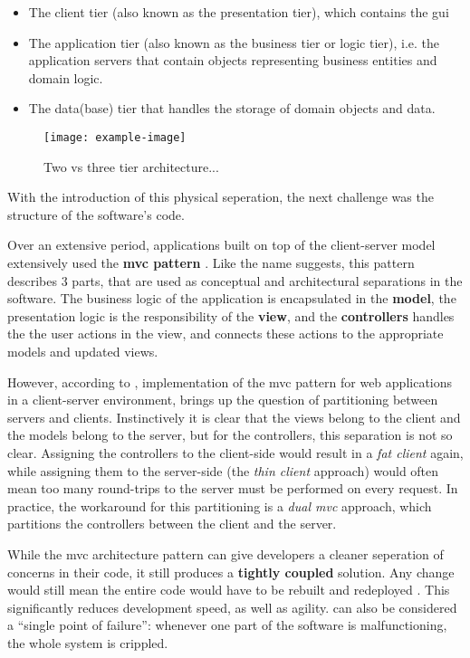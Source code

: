 \begin{itemize}
    \item The client tier (also known as the presentation tier), which contains
    the \gls{gui}
    \item The application tier (also known as the business tier or logic tier),
    i.e. the application servers that contain objects representing business
    entities and domain logic.
    \item The data(base) tier that handles the storage of domain objects and data.
\end{itemize}


\begin{figure} %
    \centering
    \texttt{[image: example-image]}
    \caption[Two vs three tier architecture]{Two vs three tier architecture...}
\end{figure}

With the introduction of this physical seperation, the next challenge was the
structure of the software's code.  

Over an extensive period, applications built on top of the client-server model
extensively used the \textbf{\gls{mvc} pattern} \autocite{Pavlenko_etal_2020}. Like the
name suggests, this pattern describes 3 parts, that are used as conceptual and
architectural separations in the software. The business logic of the application
is encapsulated in the \textbf{model}, the presentation logic is the
responsibility of the \textbf{view}, and the \textbf{controllers} handles the
the user actions in the view, and connects these actions to the appropriate
models and updated views.

However, according to \textcite{Leff_Raylfield_2001}, implementation of the
\gls{mvc} pattern for web applications in a client-server environment, brings up
the question of partitioning between servers and clients. Instinctively it is
clear that the views belong to the client and the models belong to the server,
but for the controllers, this separation is not so clear. Assigning the
controllers to the client-side would result in a \textit{fat client} again,
while assigning them to the server-side (the \textit{thin client} approach)
would often mean too many round-trips to the server must be performed on every
request. In practice, the workaround for this partitioning is a \textit{dual
\gls{mvc}} approach, which partitions the controllers between the client and the
server.


While the \gls{mvc} architecture pattern can give developers a cleaner
seperation of concerns in their code, it still produces a \textbf{tightly
coupled} solution. Any change would still mean the entire code would have to be
rebuilt and redeployed \autocite{Fowler_Microservices_2014}. This significantly
reduces development speed, as well as agility.  can also be considered
a  ``single point of failure'': whenever one part of the software is
malfunctioning, the whole system is crippled.


